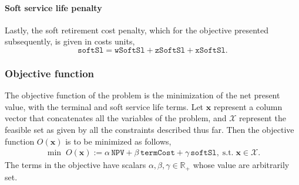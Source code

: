 \documentclass{amsart}
\begin{document}
\paragraph{Soft service life penalty}
Lastly, the soft retirement cost penalty, which for the objective presented
subsequently, is given in costs units,
\begin{equation}
    \mathtt{softSl} = \mathtt{wSoftSl} + \mathtt{zSoftSl} + \mathtt{xSoftSl}.
\end{equation}

\subsubsection{Objective function}
The objective function of the problem is the minimization of the net present
value, with the terminal and soft service life terms. 
Let $\mathbf{x}$ represent a column vector that concatenates all the variables
of the problem, and $\mathcal{X}$ represent the feasible set as given by all the
constraints described thus far. Then the objective function $O(\mathbf{x})$ is
to be minimized as follows, 
%
\begin{equation}
    \begin{split}
        \min\; O\left(\mathbf{x}\right):= \alpha \, \mathtt{NPV} 
        + \beta \, \mathtt{termCost} 
        + \gamma \, \mathtt{softSl}, \; \text{s.t.} \; \mathbf{x} \in
        \mathcal{X}.
    \end{split}
\end{equation}
%
The terms in the objective have scalars $\alpha, \beta, \gamma \in \mathbb{R}_+$
whose value are arbitrarily set. 
%
\end{document}
